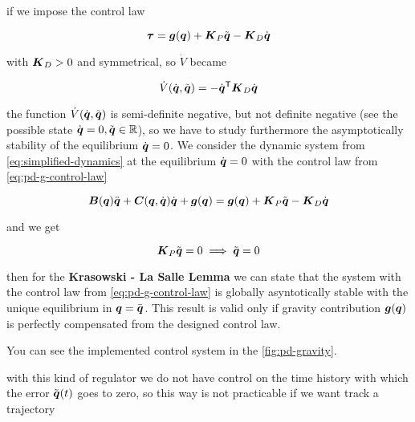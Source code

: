 if we impose the control law

\begin{equation}
    \boldsymbol{\tau} = \boldsymbol{g}(\boldsymbol{q}) + \boldsymbol{K}_P \tilde {\boldsymbol{q}} - \boldsymbol{K}_D\dot{\boldsymbol{q}} \label{eq:pd-g-control-law}
\end{equation}

with $\boldsymbol{K}_D > 0$ and symmetrical, so $\dot V$ became

\[
	\dot V(\dot{\boldsymbol{q}}, \tilde{\boldsymbol{q}}) = - \dot{\boldsymbol{q}}^{\mathsf{T}} \boldsymbol{K}_D \dot{\boldsymbol{q}}
\]

the function $\dot V(\dot{\boldsymbol{q}}, \tilde{\boldsymbol{q}})$ is semi-definite negative, but not definite negative (see the possible state $\dot{\boldsymbol{q}} = 0, \tilde{\boldsymbol{q}} \in \mathbb{R}$), so we have to study furthermore the asymptotically stability of the equilibrium $\dot{\boldsymbol{q}}=0$.
We consider the dynamic system from \autoref{eq:simplified-dynamics} at the equilibrium $\dot{\boldsymbol{q}}=0$ with the control law from \autoref{eq:pd-g-control-law}

\[
	\boldsymbol{B}(\boldsymbol{q})\ddot{\boldsymbol{q}} + \boldsymbol{C}(\boldsymbol{q},\dot{\boldsymbol{q}})\dot{\boldsymbol{q}} + \boldsymbol{g}(\boldsymbol{q}) = \boldsymbol{g}(\boldsymbol{q}) + \boldsymbol{K}_P \tilde {\boldsymbol{q}} - \boldsymbol{K}_D\dot{\boldsymbol{q}}
\]

and we get

\[
	\boldsymbol{K}_P \tilde {\boldsymbol{q}} = 0 \implies \tilde {\boldsymbol{q}} = 0
\]

then for the \textbf{Krasowski - La Salle Lemma} we can state that the system with the control law from \autoref{eq:pd-g-control-law} is globally asyntotically stable with the unique equilibrium in $\boldsymbol{q} = \bar {\boldsymbol{q}}$.
This result is valid only if gravity contribution $\boldsymbol{g}(\boldsymbol{q})$ is perfectly compensated from the designed control law.

You can see the implemented control system in the \autoref{fig:pd-gravity}.

\begin{nb}with this kind of regulator we do not have control on the time history with which the error $\tilde {\boldsymbol{q}}(t)$ goes to zero, so this way is not practicable if we want track a trajectory\end{nb}

